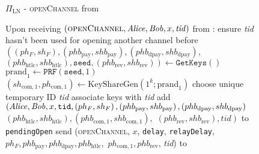 \begin{figure}[H]
  \begin{protocolbox}{$\Pi_{\mathrm{LN}}$ - \textsc{openChannel} from
  \environment}
    \begin{algorithmic}[1]
      \State Upon receiving $\left(\textsc{openChannel}, \mathit{Alice}, \mathit{Bob}, x,
      \mathit{tid}\right)$ from \environment:
      \Indent
        \State ensure \textit{tid} hasn't been used for opening another channel
        before
        \State $\left(\left(ph_F, sh_F\right), \left(phb_{\mathrm{pay}},
        shb_{\mathrm{pay}}\right), \left(phb_{\mathrm{dpay}},
        shb_{\mathrm{dpay}}\right),\right.$ $\left.\left(phb_{\mathrm{htlc}},
        shb_{\mathrm{htlc}}\right), \mathtt{seed}, \left(phb_{\mathrm{rev}},
        shb_{\mathrm{rev}}\right)\right) \gets \texttt{GetKeys}\left(\right)$
        \State $\mathrm{prand}_1 \gets \texttt{PRF}\left(\mathtt{seed},
        1\right)$
        \State $\left(sh_{\mathrm{com}, 1}, ph_{\mathrm{com}, 1}\right) \gets
        \mathrm{KeyShareGen}\left(1^k; \mathrm{prand}_1\right)$
        \State choose unique temporary ID \textit{tid} 
        \State associate keys with \textit{tid}
        \State add $\left(\mathit{Alice}, \mathit{Bob}, x, \mathtt{tid}, \left(ph_F,
        sh_F\right), \left(phb_{\mathrm{pay}}, shb_{\mathrm{pay}}\right),
        \left(phb_{\mathrm{dpay}}, shb_{\mathrm{dpay}}\right)\right.$
        $\left.\left(phb_{\mathrm{htlc}}, shb_{\mathrm{htlc}}\right),
        \left(phb_{\mathrm{com}, 1}, shb_{\mathrm{com}, 1}\right),\right.$
        $\left.\left(phb_{\mathrm{rev}}, shb_{\mathrm{rev}}\right),
        \mathit{tid}\right)$ to \texttt{pendingOpen}
        \State send (\textsc{openChannel}, $x$, \texttt{delay},
        \texttt{relayDelay}, $ph_F, phb_{\mathrm{pay}}, phb_{\mathrm{dpay}},
        phb_{\mathrm{htlc}},$ $ph_{\mathrm{com}, 1}, phb_{\mathrm{rev}}$,
        \textit{tid}) to \bob{}
      \EndIndent
    \end{algorithmic}
  \end{protocolbox}
  \caption{}
  \label{alg:protocol:open:env}
\end{figure}

